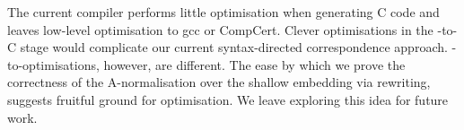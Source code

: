 \documentclass[9pt\ifFinal\else,preprint,nocopyrightspace\fi,\ifAlpha\else natbib,authoryear\fi]{sigplanconf}
\begin{document}
\begin{figure*}[t]
\begin{center}
\begin{inductive0}
The current \CDSL compiler performs little optimisation when generating C
code and leaves low-level optimisation to gcc or CompCert. Clever
optimisations in the \cdsl-to-C stage would complicate our current
syntax-directed correspondence approach. \CDSL-to-\CDSL optimisations,
however, are different. The ease by which we prove the correctness of the
A-normalisation over the shallow embedding via rewriting, suggests fruitful
ground for optimisation. We leave exploring this idea for future work.






































































\newcommand{\totalEffort}{ person-years\xspace}

\newcommand{\compilerEffort}{ person-months\xspace}

\newcommand{\certcompEffort}{ person-months\xspace}

\newcommand{\langproofEffort}{ person-months\xspace}





































\end{inductive0}
\end{center}
\end{figure*}
\end{document}
